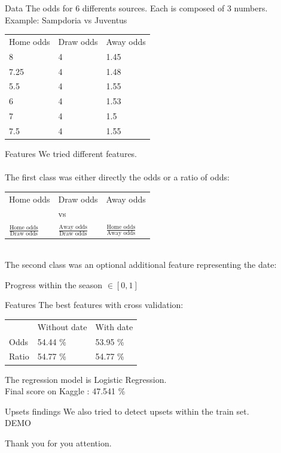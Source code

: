 \documentclass[french]{beamer}
\begin{document}
\begin{frame}{Data}
	The odds for 6 differents sources.
	Each is composed of 3 numbers.\\
	Example: Sampdoria vs Juventus\\
	\begin{center}
		\begin{tabular}{lll}
			Home odds & Draw odds & Away odds \\
			8 & 4 & 1.45\\
			7.25 & 4 & 1.48\\
			5.5 & 4 & 1.55\\
			6 & 4 & 1.53\\ 
			7 & 4 & 1.5\\ 
			7.5 & 4 & 1.55
		\end{tabular}	
	\end{center}
\end{frame}


\begin{frame}{Features}
	We tried different features.\\
	~\\
	The first class was either directly the odds or a ratio of odds:\\
	\begin{center}
		\begin{tabular}{lll}
			Home odds & Draw odds & Away odds \\
			  & vs & \\
			$\frac{\text{Home odds}}{\text{Draw odds}}$ & $\frac{\text{Away odds}}{\text{Draw odds}}$ & $\frac{\text{Home odds}}{\text{Away odds}}$
		\end{tabular}	
	\end{center}
	~\\
	The second class was an optional additional feature representing the date:\\
	\begin{center}
			Progress within the season $\in [0,1]$
	\end{center}
\end{frame}

\begin{frame}{Features}
	The best features with cross validation:
	\begin{center}
		\begin{tabular}{lll}
			 & Without date & With date\\
			 Odds & 54.44 \% & 53.95 \%\\
			 Ratio & 54.77 \% & 54.77 \%\\
		\end{tabular}	
	\end{center}
	The regression model is Logistic Regression.\\
	Final score on Kaggle : 47.541 \%
\end{frame}

\begin{frame}{Upsets findings}
	We also tried to detect upsets within the train set.\\
	DEMO \\
\end{frame}

\begin{frame}
	\begin{center}
		Thank you for you attention.
	\end{center}
\end{frame}
\end{document}
